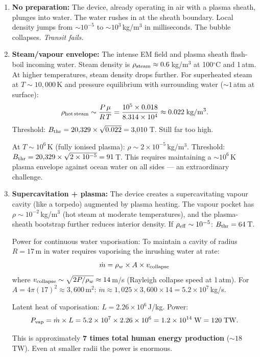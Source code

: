 \documentclass[12pt,a4paper]{article}
\begin{document}
\begin{enumerate}[label=(\roman*)]
\item \textbf{No preparation:} The device, already operating in air with a
  plasma sheath, plunges into water.  The water rushes in at the
  sheath boundary.  Local density jumps from $\sim 10^{-5}$ to
  $\sim 10^3$\,kg/m$^3$ in milliseconds.  The bubble collapses.
  \emph{Transit fails.}

\item \textbf{Steam/vapour envelope:} The intense EM field and plasma sheath
  flash-boil incoming water.  Steam density is $\rho_{\rm steam} \approx
  0.6$\,kg/m$^3$ at 100$^\circ$C and 1\,atm.  At higher temperatures,
  steam density drops further.  For superheated steam at $T \sim 10{,}000$\,K
  and pressure equilibrium with surrounding water ($\sim 1$\,atm at surface):
  \begin{equation}
  \rho_{\rm hot\,steam} \sim \frac{P\,\mu}{R\,T}
  = \frac{10^5 \times 0.018}{8.314 \times 10^4}
  \approx 0.022\;\text{kg/m$^3$.}
  \end{equation}
  Threshold: $B_{\rm thr} = 20{,}329 \times \sqrt{0.022} = 3{,}010$\,T.
  Still far too high.

  At $T \sim 10^6$\,K (fully ionised plasma):
  $\rho \sim 2\times 10^{-5}$\,kg/m$^3$.
  Threshold: $B_{\rm thr} = 20{,}329\times\sqrt{2\times 10^{-5}} = 91$\,T.
  This requires maintaining a $\sim 10^6$\,K plasma envelope against
  ocean water on all sides --- an extraordinary challenge.

\item \textbf{Supercavitation + plasma:} The device creates a
  supercavitating vapour cavity (like a torpedo) augmented by plasma
  heating.  The vapour pocket has $\rho \sim 10^{-2}$\,kg/m$^3$
  (hot steam at moderate temperatures), and the plasma-sheath bootstrap
  further reduces interior density.  If $\rho_{\rm eff} \sim 10^{-5}$:
  $B_{\rm thr} = 64$\,T.

  Power for continuous water vaporisation:
  To maintain a cavity of radius $R = 17$\,m in water requires
  vaporising the inrushing water at rate:
  \begin{equation}
  \dot{m} = \rho_w \times A \times v_{\rm collapse}
  \end{equation}
  where $v_{\rm collapse} \sim \sqrt{2P/\rho_w} \approx 14$\,m/s
  (Rayleigh collapse speed at 1\,atm).  For $A = 4\pi(17)^2 \approx
  3{,}600$\,m$^2$:
  $\dot{m} \approx 1{,}025 \times 3{,}600 \times 14 = 5.2\times 10^7$\,kg/s.

  Latent heat of vaporisation: $L = 2.26\times 10^6$\,J/kg.  Power:
  \begin{equation}
  P_{\rm vap} = \dot{m}\times L = 5.2\times 10^7 \times 2.26\times 10^6
  = 1.2\times 10^{14}\;\text{W} = 120\;\text{TW.}
  \end{equation}

  This is approximately \textbf{7 times total human energy production}
  ($\sim 18$\,TW).  Even at smaller radii the power is enormous.
\end{enumerate}
\end{document}
